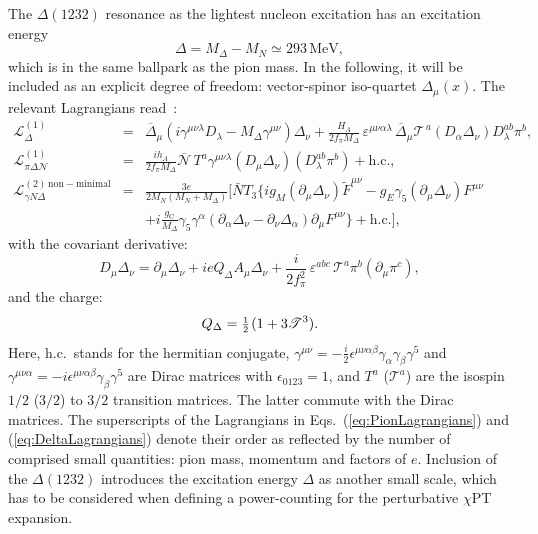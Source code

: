 \documentclass[preprints,review,accept,moreauthors,pdftex]{Definitions/mdpi}
\def\beq{\begin{equation}}
\def\eeq{\end{equation}}
\def\bea{\begin{eqnarray}}
\def\eea{\end{eqnarray}}
\def\eqlab#1{\label{eq:#1}}
\def\eref#1{(\ref{eq:#1})}
\def\al{\alpha}
\def\be{\beta}
\def\ga{\gamma} \def\Ga{{\it\Gamma}}
\def\nn{\nonumber}
\def\ol#1{\overline{#1}}
\def\half{\mbox{\small{$\frac{1}{2}\;$}}}
\begin{document}
The $\Delta(1232)$ resonance as the lightest nucleon excitation has an excitation energy
\beq
\varDelta = M_\Delta - M_N \simeq 293\, \mathrm{MeV},
\eeq
which is in the same ballpark as the pion mass. In the following, it will be included as an explicit degree of freedom: vector-spinor iso-quartet $\Delta_\mu(x)$. The relevant Lagrangians read~\cite{Ledwig:2011cx,Pascalutsa:2005ts,Pascalutsa:2005vq}:
\begin{subequations}
\eqlab{DeltaLagrangians}
\bea
\mathcal{L}^{(1)}_\Delta&=&\ol{\Delta}_\mu \left(i \gamma^{\mu \nu \lambda}D_\lambda -M_\Delta \gamma^{\mu \nu}\right) \Delta_\nu+\frac{H_A}{2f_\pi M_\Delta}\,\varepsilon^{\mu \nu \al \lambda}\,\ol \Delta_\mu \mathscr{T}^{\,a} \left(D_\al \Delta_\nu\right)D_\lambda^{ab}\pi^b,\qquad\quad\\
\mathcal{L}^{(1)}_{\pi\Delta \mathcal{N}}&=&\frac{i h_A}{2f_\pi M_\Delta} \ol{\mathcal{N}} \,T^a\gamma^{\mu \nu \lambda}\left(D_\mu \Delta_\nu\right)\left(D_\lambda^{ab}\pi^b\right)+\text{h.c.},\\
\eqlab{nmGammaNDeltaLag}
 \mathcal{L}^{(2) \,\mathrm{non-minimal}}_{\gamma N \Delta}&=&\frac{3e}{2M_N(M_N+M_\Delta)}\Bigg[\bar{N} T_3\Big\{i g_M (\partial_\mu \Delta_\nu) \tilde{F}^{\mu \nu}-g_E  \gamma_5 (\partial_\mu \Delta_\nu) F^{\mu \nu}\eqlab{LagrangianGND}\\
 &&+i \frac{g_\mathrm{C}}{M_\Delta}\gamma_5 \gamma^\al (\partial_\al \Delta_\nu-\partial_\nu \Delta_\al)\partial_\mu F^{\mu \nu}\Big\}+\text{h.c.}\Bigg],\nn
\eea
\end{subequations}
with the
covariant derivative:
\beq
D_\mu \Delta_\nu= \partial_\mu \Delta_\nu+ie Q_\Delta A_\mu \Delta_\nu+\frac{i}{2f_\pi^2} \,\varepsilon^{abc}\, \mathscr{T}^a\pi^b(\partial_\mu \pi^c),
\eeq
and the
charge:
\beq
Q_\Delta=\half \!(1+3 \mathscr{T}^3).
\eeq
Here, h.c.\ stands for the hermitian conjugate, $\gamma^{\mu \nu}=-\frac{i}{2}\epsilon^{\mu \nu \al \be}\ga_\al \ga_\be \ga^5$ and $\gamma^{\mu \nu \al}=-i\epsilon^{\mu \nu \al \be} \ga_\be \ga^5$ are Dirac matrices with $\epsilon_{0123}=1$, and $T^a$ ($\mathscr{T}^a$) are the isospin $1/2$ ($3/2$) to $3/2$ transition matrices. The latter commute with the Dirac matrices. The superscripts of the Lagrangians in Eqs.~\eref{PionLagrangians} and \eref{DeltaLagrangians} denote their order as reflected by the number of comprised small quantities: pion mass, momentum and factors of $e$. Inclusion of the $\Delta(1232)$ introduces the excitation energy $\varDelta$ as another small scale, which has to be considered when defining a power-counting for the perturbative $\chi$PT expansion. 
\end{document}
